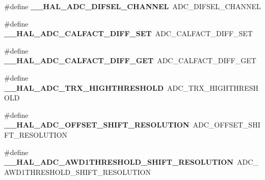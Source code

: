 \begin{DoxyCompactItemize}
\item 
\#define {\bfseries \+\_\+\+\_\+\+H\+A\+L\+\_\+\+A\+D\+C\+\_\+\+D\+I\+F\+S\+E\+L\+\_\+\+C\+H\+A\+N\+N\+EL}~A\+D\+C\+\_\+\+D\+I\+F\+S\+E\+L\+\_\+\+C\+H\+A\+N\+N\+EL\hypertarget{group___h_a_l___a_d_c___aliased___macros_ga697c5bcf01d90462bf0c65c1434204a2}{}\label{group___h_a_l___a_d_c___aliased___macros_ga697c5bcf01d90462bf0c65c1434204a2}

\item 
\#define {\bfseries \+\_\+\+\_\+\+H\+A\+L\+\_\+\+A\+D\+C\+\_\+\+C\+A\+L\+F\+A\+C\+T\+\_\+\+D\+I\+F\+F\+\_\+\+S\+ET}~A\+D\+C\+\_\+\+C\+A\+L\+F\+A\+C\+T\+\_\+\+D\+I\+F\+F\+\_\+\+S\+ET\hypertarget{group___h_a_l___a_d_c___aliased___macros_ga0d6a948351847da8e821fd673cd5395c}{}\label{group___h_a_l___a_d_c___aliased___macros_ga0d6a948351847da8e821fd673cd5395c}

\item 
\#define {\bfseries \+\_\+\+\_\+\+H\+A\+L\+\_\+\+A\+D\+C\+\_\+\+C\+A\+L\+F\+A\+C\+T\+\_\+\+D\+I\+F\+F\+\_\+\+G\+ET}~A\+D\+C\+\_\+\+C\+A\+L\+F\+A\+C\+T\+\_\+\+D\+I\+F\+F\+\_\+\+G\+ET\hypertarget{group___h_a_l___a_d_c___aliased___macros_ga04d8142122bd9275a1219043edc63d98}{}\label{group___h_a_l___a_d_c___aliased___macros_ga04d8142122bd9275a1219043edc63d98}

\item 
\#define {\bfseries \+\_\+\+\_\+\+H\+A\+L\+\_\+\+A\+D\+C\+\_\+\+T\+R\+X\+\_\+\+H\+I\+G\+H\+T\+H\+R\+E\+S\+H\+O\+LD}~A\+D\+C\+\_\+\+T\+R\+X\+\_\+\+H\+I\+G\+H\+T\+H\+R\+E\+S\+H\+O\+LD\hypertarget{group___h_a_l___a_d_c___aliased___macros_ga33afa59f288d4671512aed3dfb8f70b7}{}\label{group___h_a_l___a_d_c___aliased___macros_ga33afa59f288d4671512aed3dfb8f70b7}

\item 
\#define {\bfseries \+\_\+\+\_\+\+H\+A\+L\+\_\+\+A\+D\+C\+\_\+\+O\+F\+F\+S\+E\+T\+\_\+\+S\+H\+I\+F\+T\+\_\+\+R\+E\+S\+O\+L\+U\+T\+I\+ON}~A\+D\+C\+\_\+\+O\+F\+F\+S\+E\+T\+\_\+\+S\+H\+I\+F\+T\+\_\+\+R\+E\+S\+O\+L\+U\+T\+I\+ON\hypertarget{group___h_a_l___a_d_c___aliased___macros_ga0f83fc077ad488745139c8e24641d437}{}\label{group___h_a_l___a_d_c___aliased___macros_ga0f83fc077ad488745139c8e24641d437}

\item 
\#define {\bfseries \+\_\+\+\_\+\+H\+A\+L\+\_\+\+A\+D\+C\+\_\+\+A\+W\+D1\+T\+H\+R\+E\+S\+H\+O\+L\+D\+\_\+\+S\+H\+I\+F\+T\+\_\+\+R\+E\+S\+O\+L\+U\+T\+I\+ON}~A\+D\+C\+\_\+\+A\+W\+D1\+T\+H\+R\+E\+S\+H\+O\+L\+D\+\_\+\+S\+H\+I\+F\+T\+\_\+\+R\+E\+S\+O\+L\+U\+T\+I\+ON\hypertarget{group___h_a_l___a_d_c___aliased___macros_ga616002cefa3a1ba7af4fa612afd02561}{}\label{group___h_a_l___a_d_c___aliased___macros_ga616002cefa3a1ba7af4fa612afd02561}


\end{DoxyCompactItemize}
